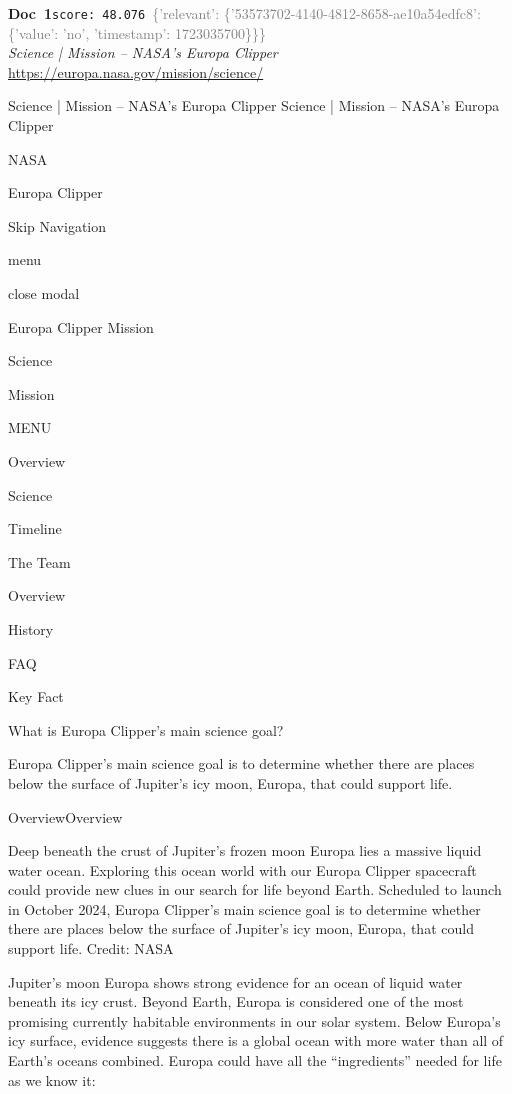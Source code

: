 \documentclass[a4paper,11pt]{article}
\begin{document}
\begin{docenv}
{\footnotesize\textcolor{doccolor}{\textbf{Doc~1}}}\hfill{\tiny\texttt{score:~48.076}}\ {\tiny\textcolor{gray}{\{'relevant': \{'53573702-4140-4812-8658-ae10a54edfc8': \{'value': 'no', 'timestamp': 1723035700\}\}\}}}\\[3pt]
{\small\textit{Science | Mission – NASA's Europa Clipper}}\\[2pt]
{\tiny\url{https://europa.nasa.gov/mission/science/}}\\[4pt]
{\footnotesize Science | Mission – NASA's Europa Clipper
Science | Mission – NASA's Europa Clipper

NASA

Europa Clipper

Skip Navigation

menu

close modal

Europa Clipper Mission

Science

Mission

MENU

Overview

Science

Timeline

The Team

Overview

History

FAQ

Key Fact

What is Europa Clipper's main science goal? 

Europa Clipper’s main science goal is to determine whether there are places below the surface of Jupiter’s icy moon, Europa, that could support life.

OverviewOverview

Deep beneath the crust of Jupiter’s frozen moon Europa lies a massive liquid water ocean. Exploring this ocean world with our Europa Clipper spacecraft could provide new clues in our search for life beyond Earth. Scheduled to launch in October 2024, Europa Clipper’s main science goal is to determine whether there are places below the surface of Jupiter’s icy moon, Europa, that could support life. Credit: NASA

Jupiter’s moon Europa shows strong evidence for an ocean of liquid water beneath its icy crust. Beyond Earth, Europa is considered one of the most promising currently habitable environments in our solar system. 
Below Europa’s icy surface, evidence suggests there is a global ocean with more water than all of Earth’s oceans combined. Europa could have all the “ingredients” needed for life as we know it: 

}
\end{docenv}
\end{document}
